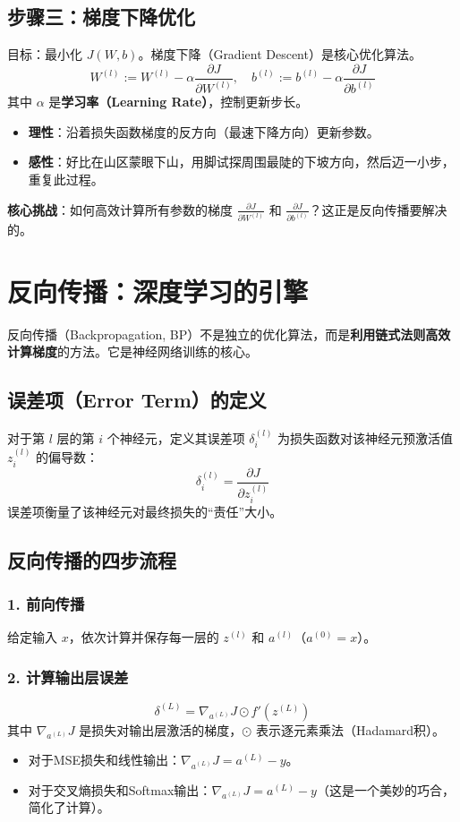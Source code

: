 \subsection{步骤三：梯度下降优化}
目标：最小化 $J(W,b)$。梯度下降（Gradient Descent）是核心优化算法。
\[
W^{(l)} := W^{(l)} - \alpha \frac{\partial J}{\partial W^{(l)}}, \quad b^{(l)} := b^{(l)} - \alpha \frac{\partial J}{\partial b^{(l)}}
\]
其中 $\alpha$ 是\textbf{学习率（Learning Rate）}，控制更新步长。
\begin{itemize}
    \item \textbf{理性}：沿着损失函数梯度的反方向（最速下降方向）更新参数。
    \item \textbf{感性}：好比在山区蒙眼下山，用脚试探周围最陡的下坡方向，然后迈一小步，重复此过程。
\end{itemize}
\textbf{核心挑战}：如何高效计算所有参数的梯度 $\frac{\partial J}{\partial W^{(l)}}$ 和 $\frac{\partial J}{\partial b^{(l)}}$？这正是反向传播要解决的。

\section{反向传播：深度学习的引擎}

反向传播（Backpropagation, BP）不是独立的优化算法，而是\textbf{利用链式法则高效计算梯度}的方法。它是神经网络训练的核心。

\subsection{误差项（Error Term）的定义}
对于第 $l$ 层的第 $i$ 个神经元，定义其误差项 $\delta_i^{(l)}$ 为损失函数对该神经元预激活值 $z_i^{(l)}$ 的偏导数：
\[
\delta_i^{(l)} = \frac{\partial J}{\partial z_i^{(l)}}
\]
误差项衡量了该神经元对最终损失的“责任”大小。

\subsection{反向传播的四步流程}

\subsubsection{1. 前向传播}
给定输入 $x$，依次计算并保存每一层的 $z^{(l)}$ 和 $a^{(l)}$（$a^{(0)} = x$）。

\subsubsection{2. 计算输出层误差}
\[
\delta^{(L)} = \nabla_{a^{(L)}} J \odot f'(z^{(L)})
\]
其中 $\nabla_{a^{(L)}} J$ 是损失对输出层激活的梯度，$\odot$ 表示逐元素乘法（Hadamard积）。
\begin{itemize}
    \item 对于MSE损失和线性输出：$\nabla_{a^{(L)}} J = a^{(L)} - y$。
    \item 对于交叉熵损失和Softmax输出：$\nabla_{a^{(L)}} J = a^{(L)} - y$（这是一个美妙的巧合，简化了计算）。
\end{itemize}

